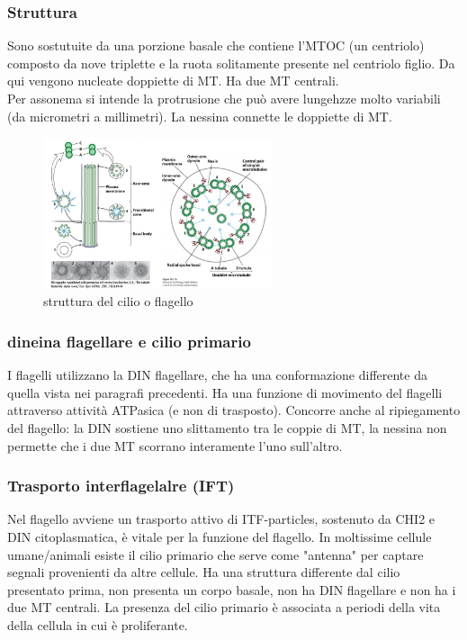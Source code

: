         \subsubsection{Struttura}
            Sono sostutuite da una porzione basale che contiene l'MTOC (un centriolo) composto da nove triplette e la ruota solitamente presente nel centriolo figlio. Da qui vengono nucleate doppiette di MT. Ha due MT centrali.\\
            Per assonema si intende la protrusione che può avere lungehzze molto variabili (da micrometri a millimetri). La nessina connette le doppiette di MT.
            \begin{figure}[h]
                \centering
                \includegraphics[width=0.6\textwidth]{images/cilia.JPG}
                \caption{\small struttura del cilio o flagello}
                \label{fig:mesh1}
            \end{figure}
        
        \subsubsection{dineina flagellare e cilio primario}
            I flagelli utilizzano la DIN flagellare, che ha una conformazione differente da quella vista nei paragrafi precedenti. Ha una funzione di movimento del flagelli attraverso attività ATPasica (e non di trasposto).
            Concorre anche al ripiegamento del flagello: la DIN sostiene uno slittamento tra le coppie di MT, la nessina non permette che i due MT scorrano interamente l'uno sull'altro.\\ 
            
        \subsubsection{Trasporto interflagelalre (IFT)}
            Nel flagello avviene un trasporto attivo di ITF-particles, sostenuto da CHI2 e DIN citoplasmatica, è vitale per la funzione del flagello.
            In moltissime cellule umane/animali esiste il cilio primario che serve come "antenna" per captare segnali provenienti da altre cellule. Ha una struttura differente dal cilio presentato prima, non presenta un corpo basale, non ha DIN flagellare e non ha i due MT centrali.
            La presenza del cilio primario è associata a periodi della vita della cellula in cui è proliferante.
    
